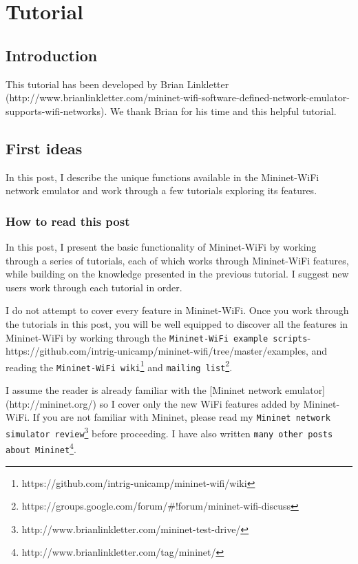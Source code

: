 \chapter{Tutorial}\label{tutorial}

\section{Introduction}
This tutorial has been developed by Brian Linkletter (http://www.brianlinkletter.com/mininet-wifi-software-defined-network-emulator-supports-wifi-networks). We thank Brian for his time and this helpful tutorial.

\section{First ideas}

In this post, I describe the unique functions available in the Mininet-WiFi network emulator and work through a few tutorials exploring its features.

\subsection{How to read this post}

In this post, I present the basic functionality of Mininet-WiFi by working through a series of tutorials, each of which works through Mininet-WiFi features, while building on the knowledge presented in the previous tutorial. I suggest new users work through each tutorial in order.

I do not attempt to cover every feature in Mininet-WiFi. Once you work through the tutorials in this post, you will be well equipped to discover all the features in Mininet-WiFi by working through the \texttt{Mininet-WiFi example scripts}- https://github.com/intrig-unicamp/mininet-wifi/tree/master/examples, and reading the \texttt{Mininet-WiFi wiki}\footnote{https://github.com/intrig-unicamp/mininet-wifi/wiki} and \texttt{mailing list}\footnote{https://groups.google.com/forum/\#!forum/mininet-wifi-discuss}.

I assume the reader is already familiar with the [Mininet network emulator](http://mininet.org/) so I cover only the new WiFi features added by Mininet-WiFi. If you are not familiar with Mininet, please read my \texttt{Mininet network simulator review}\footnote{http://www.brianlinkletter.com/mininet-test-drive/} before proceeding. I have also written \texttt{many other posts about Mininet}\footnote{http://www.brianlinkletter.com/tag/mininet/}.

